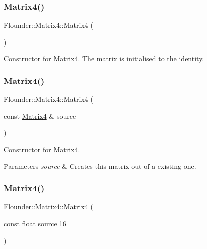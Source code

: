 \subsubsection{\texorpdfstring{Matrix4()}{Matrix4()}\hspace{0.1cm}{\footnotesize\ttfamily [1/3]}}
{\footnotesize\ttfamily Flounder\+::\+Matrix4\+::\+Matrix4 (\begin{DoxyParamCaption}{ }\end{DoxyParamCaption})}



Constructor for \hyperlink{class_flounder_1_1_matrix4}{Matrix4}. The matrix is initialised to the identity. 

\mbox{\label{class_flounder_1_1_matrix4_af335508bd418a2a13059a0b95b3f486f}} 
\subsubsection{\texorpdfstring{Matrix4()}{Matrix4()}\hspace{0.1cm}{\footnotesize\ttfamily [2/3]}}
{\footnotesize\ttfamily Flounder\+::\+Matrix4\+::\+Matrix4 (\begin{DoxyParamCaption}\item[{const \hyperlink{class_flounder_1_1_matrix4}{Matrix4} \&}]{source }\end{DoxyParamCaption})}



Constructor for \hyperlink{class_flounder_1_1_matrix4}{Matrix4}. 


\begin{DoxyParams}{Parameters}
{\em source} & Creates this matrix out of a existing one. \\
\hline
\end{DoxyParams}
\mbox{\label{class_flounder_1_1_matrix4_ae26b549171fee7ae0c76c4f51744f95b}} 
\subsubsection{\texorpdfstring{Matrix4()}{Matrix4()}\hspace{0.1cm}{\footnotesize\ttfamily [3/3]}}
{\footnotesize\ttfamily Flounder\+::\+Matrix4\+::\+Matrix4 (\begin{DoxyParamCaption}\item[{const float}]{source\mbox{[}16\mbox{]} }\end{DoxyParamCaption})}



